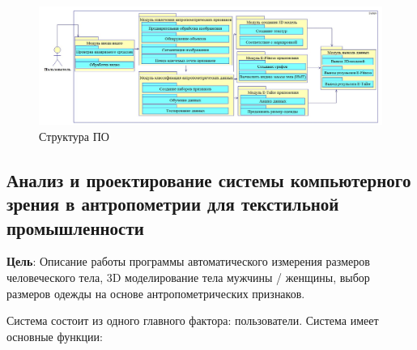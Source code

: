 \begin{figure}[ht!]
\centering
\includegraphics [scale=0.4] {images/h35.png}
\begin{center}
\caption{Структура ПО} \label{img35}
\end{center}
\end{figure}

\subsection{Анализ и проектирование системы компьютерного зрения в антропометрии для текстильной промышленности}

\textbf{Цель}: Описание работы программы автоматического измерения размеров человеческого тела, 3D моделирование тела мужчины / женщины, выбор размеров одежды на основе антропометрических признаков.

Система состоит из одного главного фактора: пользователи. Система имеет основные функции:

